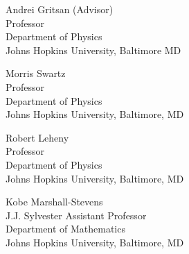\begin{singlespace}


    \vspace{0.3in}
    

    \vspace{0.2in}
    
    Andrei Gritsan (Advisor) \\
    \null\quad\quad Professor \\
    \null\quad\quad Department of Physics\\
    \null\quad\quad Johns Hopkins University, Baltimore MD 


    \vspace{0.1in}
    
    Morris Swartz\\
    \null\quad\quad Professor \\
    \null\quad\quad Department of Physics \\
    \null\quad\quad Johns Hopkins University, Baltimore, MD 
    
    \vspace{0.1in}
    
    Robert Leheny \\
    \null\quad\quad Professor \\
    \null\quad\quad Department of Physics \\
    \null\quad\quad Johns Hopkins University, Baltimore, MD 

    \vspace{0.1in}

    Kobe Marshall-Stevens \\
    \null\quad\quad J.J. Sylvester Assistant Professor \\
    \null\quad\quad Department of Mathematics \\
    \null\quad\quad Johns Hopkins University, Baltimore, MD 
    

\end{singlespace}
